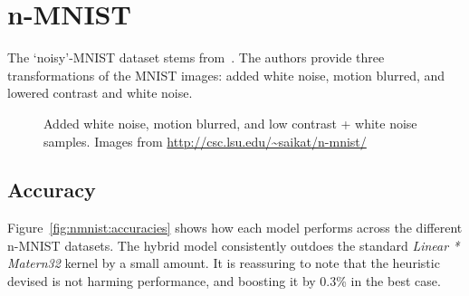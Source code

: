 \documentclass{article}
\begin{document}
\section{n-MNIST}

The `noisy'-MNIST dataset stems from~\citet{basu2017learning}. The authors provide three transformations of the MNIST images: added white noise, motion blurred, and lowered contrast and white noise.

\begin{figure}[htb]
\centering
{}
\centering
{}
\centering
{}

\caption{Added white noise, motion blurred, and low contrast + white noise samples. Images from \url{http://csc.lsu.edu/~saikat/n-mnist/}}
\end{figure}



\subsection{Accuracy}


Figure~\ref{fig:nmnist:accuracies} shows how each model performs across the different n-MNIST datasets. The hybrid model consistently outdoes the standard \textit{Linear * Matern32} kernel by a small amount. It is reassuring to note that the heuristic devised is not harming performance, and boosting it by 0.3\% in the best case.
\end{document}
